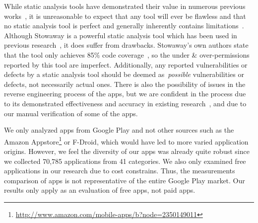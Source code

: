 \documentclass{sig-alternate-05-2015}
\begin{document}
While static analysis tools have demonstrated their value in numerous previous works~\cite{Felt:2011:APD:2046707.2046779, Pearce:2012:APS:2414456.2414498}, it is unreasonable to expect that any tool will ever be flawless and that no static analysis tool is perfect and generally inherently contains limitations~\cite{chess2004static}. Although Stowaway is a powerful static analysis tool which has been used in previous research~\cite{Felt:2011:APD:2046707.2046779, Pearce:2012:APS:2414456.2414498}, it does suffer from drawbacks. Stowaway's own authors state that the tool only achieves 85\% code coverage~\cite{Felt:2011:APD:2046707.2046779}, so the under \& over-permissions reported by this tool are imperfect. Additionally, any reported vulnerabilities or defects by a static analysis tool should be deemed as~\emph{possible} vulnerabilities or defects, not necessarily actual ones. There is also the possibility of issues in the reverse engineering process of the apps, but we are confident in the process due to its demonstrated effectiveness and accuracy in existing research~\cite{krutz2015FDroid, Lee_2013}, and due to our manual verification of some of the apps.





We only analyzed apps from Google Play and not other sources such as the Amazon Appstore\footnote{\url{http://www.amazon.com/mobile-apps/b?node=2350149011}} or F-Droid, which would have led to more varied application origins. However, we feel the diversity of our apps was already quite robust since we collected 70,785  applications from 41 categories. We also only examined free applications in our research due to cost constrains. Thus, the measurements comparison of apps is not representative of the entire Google Play market. Our results only apply as an evaluation of free apps, not paid apps.
\end{document}

